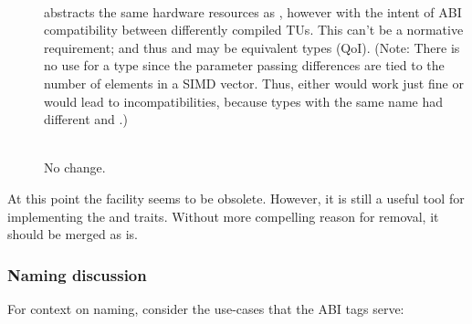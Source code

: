 \begin{description}
  \item[]\ \\
     abstracts the same hardware resources as , however with the intent of ABI compatibility between differently compiled TUs.
    This can't be a normative requirement; and thus  and  may be equivalent types (QoI).
    (Note: There is no use for a \simdabi{} type since the parameter passing differences are tied to the number of elements in a SIMD vector.
    Thus, either \simdabi{} would work just fine or \simdabi{} would lead to incompatibilities, because types with the same name had different  and .)

  \item[]\ \\
    No change.
\end{description}

At this point the \simdabi{} facility seems to be obsolete.
However, it is still a useful tool for implementing the  and  traits.
Without more compelling reason for removal, it should be merged as is.

\subsubsection{Naming discussion}

For context on naming, consider the use-cases that the ABI tags serve:

